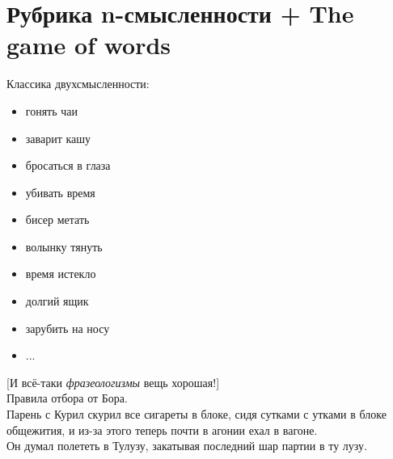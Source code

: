 \section{Рубрика n-смысленности + The game of words}

Классика двухсмысленности:
\begin{itemize}
    \item гонять чаи\\
    \item заварит кашу\\
    \item бросаться в глаза\\
    \item убивать время\\
    \item бисер метать\\
    \item волынку тянуть\\
    \item время истекло\\
    \item долгий ящик\\
    \item зарубить на носу\\
    \item ...\\
\end{itemize}

[И всё-таки \emph{фразеологизмы} вещь хорошая!]\\


Правила отбора от Бора.\\


Парень с Курил скурил все сигареты в блоке, сидя сутками с утками
в блоке общежития, и из-за этого теперь почти в агонии ехал в
вагоне.\\


Он думал полететь в Тулузу, закатывая последний шар партии в ту
лузу.
